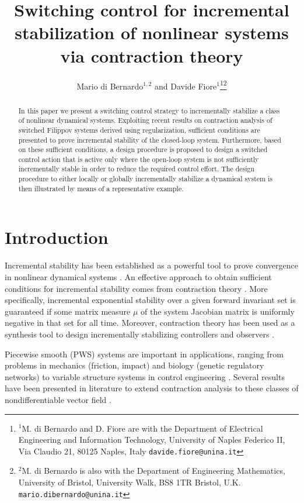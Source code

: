 \documentclass[letterpaper, 10 pt, conference]{ieeeconf}
\title{\LARGE \bf
Switching control for incremental stabilization of nonlinear systems via contraction theory
}
\author{Mario di Bernardo$^{1,2}$ and Davide Fiore$^{1}$\thanks{$^{1}$M. di Bernardo and D. Fiore are with the Department of Electrical Engineering and Information Technology, University of Naples Federico II, Via Claudio 21, 80125 Naples, Italy
        {\tt\small davide.fiore@unina.it}}\thanks{$^{2}$M. di Bernardo is also with the Department of Engineering Mathematics, University of Bristol, University Walk, BS8 1TR Bristol, U.K.
        {\tt\small mario.dibernardo@unina.it}}}
\begin{document}
\maketitle
\thispagestyle{empty}
\pagestyle{empty}


\begin{abstract}
In this paper we present a switching control strategy to incrementally stabilize a class of nonlinear dynamical systems. Exploiting recent results on contraction analysis of switched Filippov systems derived using regularization, sufficient conditions are presented to prove incremental stability of the closed-loop system. Furthermore, based on these sufficient conditions, a design procedure is proposed to design a switched control action that is active only where the open-loop system is not sufficiently incrementally stable in order to reduce the required control effort. The design procedure to either locally or globally incrementally stabilize a dynamical system is then illustrated by means of a representative example.
\end{abstract}


\section{Introduction}
Incremental stability has been established as a powerful tool to prove convergence in nonlinear dynamical systems \cite{angeli2002lyapunov}. An effective approach to obtain sufficient conditions for incremental stability comes from contraction theory \cite{lohmiller1998contraction,russo2010global,jouffroy2005some, forni2014differential,aminzare2014contraction}. More specifically, incremental exponential stability over a given forward invariant set is guaranteed if some matrix measure $\mu$ of the system Jacobian matrix is uniformly negative in that set for all time. Moreover, contraction theory has been used as a synthesis tool to design incrementally stabilizing controllers and observers \cite{lohmiller1998contraction,manchester2014control,manchester2014output,van2008tracking}.

Piecewise smooth (PWS) systems are important in applications, ranging from problems in mechanics (friction, impact) and biology (genetic regulatory networks) to variable structure systems in control engineering \cite{filippov1988differential,cortes2008discontinuous,bernardo2008piecewise,utkin2013sliding}. Several results have been presented in literature to extend contraction analysis to these classes of nondifferentiable vector field \cite{lohmiller2000nonlinear,pavlov2005convergentp1,pavlov2005convergentp2,di2014contraction,lu2015contraction,di2013incremental,di2014incremental,fiore2015contraction}.
\end{document}
